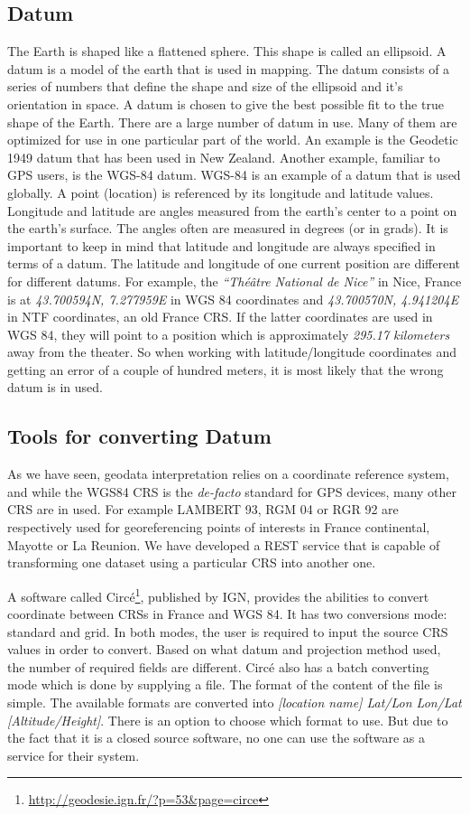 \subsection{Datum}
The Earth is shaped like a flattened sphere. This shape is called an ellipsoid. A datum is a model of the earth that is used in mapping. The datum consists of a series of numbers that define the shape and size of the ellipsoid and it's orientation in space. A datum is chosen to give the best possible fit to the true shape of the Earth.
There are a large number of datum in use. Many of them are optimized for use in one particular part of the world. An example is the Geodetic 1949 datum that has been used in New Zealand. Another example, familiar to GPS users, is the WGS-84 datum. WGS-84 is an example of a datum that is used globally.
A point (location) is referenced by its longitude and latitude values. Longitude and latitude are angles measured from the earth's center to a point on the earth's surface. The angles often are measured in degrees (or in grads). It is important to keep in mind that latitude and longitude are always specified in terms of a datum. The latitude and longitude of one current position are different for different datums. For example, the \emph{``Th\'{e}\^{a}tre National de Nice''} in Nice, France is at \emph{43.700594\degree N, 7.277959\degree E} in WGS 84 coordinates and \emph{43.700570\degree N, 4.941204\degree E} in NTF coordinates, an old France CRS. If the latter coordinates are used in WGS 84, they will point to a position which is approximately \textit{295.17 kilometers} away from the theater. So when working with latitude/longitude coordinates and getting an error of a couple of hundred meters, it is most likely that the wrong datum is in used.

\subsection{Tools for converting Datum}
As we have seen, geodata interpretation relies on a coordinate reference system, and while the WGS84 CRS is the \textit{de-facto} standard for GPS devices, many other CRS are in used. For example LAMBERT 93, RGM 04 or RGR 92 are respectively used for georeferencing points of interests in France continental, Mayotte or La Reunion. We have developed a REST service that is capable of transforming one dataset using a particular CRS into another one. 

A software called Circ\'e\footnote{\url{http://geodesie.ign.fr/?p=53&page=circe}}, published by IGN, provides the abilities to convert coordinate between CRSs in France and WGS 84. It has two conversions mode: standard and grid. In both modes, the user is required to input the source CRS values in order to convert. Based on what datum and projection method used, the number of required fields are different. 
Circ\'e also has a batch converting mode which is done by supplying a file. The format of the content of the file is simple. The available formats are converted into \textsl{[location name] {Lat/Lon} {Lon/Lat} [Altitude/Height]}. There is an option to choose which format to use. But due to the fact that it is a closed source software, no one can use the software as a service for their system.

